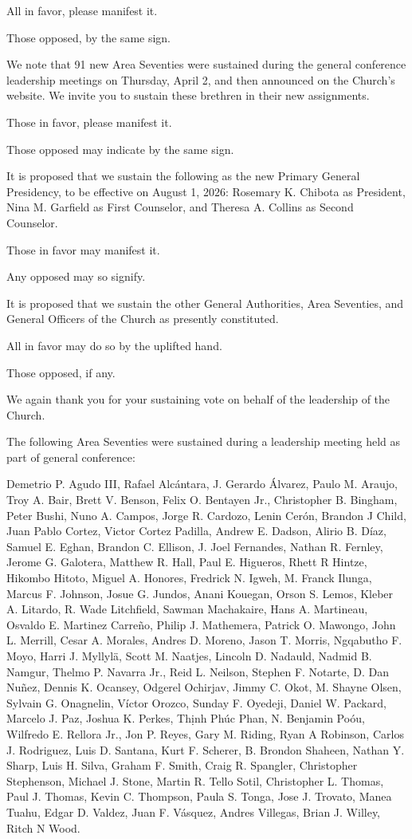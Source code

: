 \documentclass[letterpaper, 11pt]{report}
\newcommand{\intalkheader}[1]{
    \vspace{0.75em}
    \noindent{\normalsize\bfseries #1}
    \par\nopagebreak %
    \vspace{0.25em}
    \nopagebreak     %
}
\begin{document}
All in favor, please manifest it.

Those opposed, by the same sign.

We note that 91 new Area Seventies were sustained during the general conference leadership meetings on Thursday, April 2, and then announced on the Church’s website. We invite you to sustain these brethren in their new assignments.

Those in favor, please manifest it.

Those opposed may indicate by the same sign.

It is proposed that we sustain the following as the new Primary General Presidency, to be effective on August 1, 2026: Rosemary K. Chibota as President, Nina M. Garfield as First Counselor, and Theresa A. Collins as Second Counselor.

Those in favor may manifest it.

Any opposed may so signify.

It is proposed that we sustain the other General Authorities, Area Seventies, and General Officers of the Church as presently constituted.

All in favor may do so by the uplifted hand.

Those opposed, if any.

We again thank you for your sustaining vote on behalf of the leadership of the Church.

\intalkheader{Changes to Area Seventies}

The following Area Seventies were sustained during a leadership meeting held as part of general conference:

Demetrio P. Agudo III, Rafael Alcántara, J. Gerardo Álvarez, Paulo M. Araujo, Troy A. Bair, Brett V. Benson, Felix O. Bentayen Jr., Christopher B. Bingham, Peter Bushi, Nuno A. Campos, Jorge R. Cardozo, Lenin Cerón, Brandon J Child, Juan Pablo Cortez, Victor Cortez Padilla, Andrew E. Dadson, Alirio B. Díaz, Samuel E. Eghan, Brandon C. Ellison, J. Joel Fernandes, Nathan R. Fernley, Jerome G. Galotera, Matthew R. Hall, Paul E. Higueros, Rhett R Hintze, Hikombo Hitoto, Miguel A. Honores, Fredrick N. Igweh, M. Franck Ilunga, Marcus F. Johnson, Josue G. Jundos, Anani Kouegan, Orson S. Lemos, Kleber A. Litardo, R. Wade Litchfield, Sawman Machakaire, Hans A. Martineau, Osvaldo E. Martinez Carreño, Philip J. Mathemera, Patrick O. Mawongo, John L. Merrill, Cesar A. Morales, Andres D. Moreno, Jason T. Morris, Ngqabutho F. Moyo, Harri J. Myllylä, Scott M. Naatjes, Lincoln D. Nadauld, Nadmid B. Namgur, Thelmo P. Navarra Jr., Reid L. Neilson, Stephen F. Notarte, D. Dan Nuñez, Dennis K. Ocansey, Odgerel Ochirjav, Jimmy C. Okot, M. Shayne Olsen, Sylvain G. Onagnelin, Víctor Orozco, Sunday F. Oyedeji, Daniel W. Packard, Marcelo J. Paz, Joshua K. Perkes, Thịnh Phúc Phan, N. Benjamin Poóu, Wilfredo E. Rellora Jr., Jon P. Reyes, Gary M. Riding, Ryan A Robinson, Carlos J. Rodriguez, Luis D. Santana, Kurt F. Scherer, B. Brondon Shaheen, Nathan Y. Sharp, Luis H. Silva, Graham F. Smith, Craig R. Spangler, Christopher Stephenson, Michael J. Stone, Martin R. Tello Sotil, Christopher L. Thomas, Paul J. Thomas, Kevin C. Thompson, Paula S. Tonga, Jose J. Trovato, Manea Tuahu, Edgar D. Valdez, Juan F. Vásquez, Andres Villegas, Brian J. Willey, Ritch N Wood.
\end{document}
